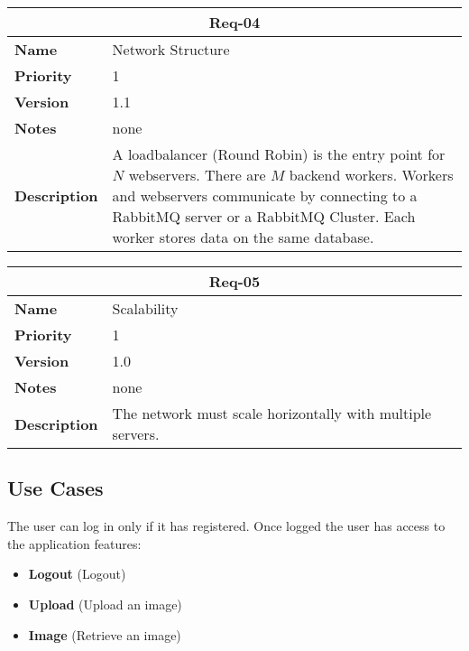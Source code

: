 \documentclass[../documentation.tex]{subfiles}
\begin{document}
\bgroup{}
\def\arraystretch{1.25}
\begin{center}
    \begin{tabular}{ |l|p{9cm}| }
        \hline
        \multicolumn{2}{|c|}{\textbf{Req-04}} \\
        \hline
        \textbf{Name} & Network Structure \\
        \hline
        \textbf{Priority} & 1 \\
        \hline
        \textbf{Version} & 1.1 \\
        \hline
        \textbf{Notes} & none \\
        \hline
        \textbf{Description} & A loadbalancer (Round Robin) is the entry point for \(N\) webservers.
        There are \(M\) backend workers. Workers and webservers communicate by connecting to a RabbitMQ
        server or a RabbitMQ Cluster.
        Each worker stores data on the same database. \\
        \hline
    \end{tabular}
\end{center}
\egroup{}

\bgroup{}
\def\arraystretch{1.25}
\begin{center}
    \begin{tabular}{ |l|p{9cm}| }
        \hline
        \multicolumn{2}{|c|}{\textbf{Req-05}} \\
        \hline
        \textbf{Name} & Scalability \\
        \hline
        \textbf{Priority} & 1 \\
        \hline
        \textbf{Version} & 1.0 \\
        \hline
        \textbf{Notes} & none \\
        \hline
        \textbf{Description} & The network must scale horizontally with multiple servers. \\
        \hline
    \end{tabular}
\end{center}
\egroup{}

\pagebreak

\subsection{Use Cases}

The user can log in only if it has registered. Once logged the user has access
to the application features:
\begin{itemize}
    \item \textbf{Logout} (Logout)
    \item \textbf{Upload} (Upload an image)
    \item \textbf{Image} (Retrieve an image)
\end{itemize}
\end{document}
